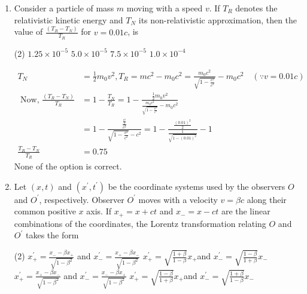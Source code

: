 \begin{enumerate}
	\item Consider a particle of mass $m$ moving with a speed $v$. If $T_{R}$ denotes the relativistic kinetic energy and $T_{N}$ its non-relativistic approximation, then the value of $\frac{\left(T_{R}-T_{N}\right)}{T_{R}}$ for $v=0.01 c$, is
	{}
\begin{tasks}(2)
	\task[\textbf{A.}] $1.25 \times 10^{-5}$
	\task[\textbf{B.}]$5.0 \times 10^{-5}$
	\task[\textbf{C.}]$7.5 \times 10^{-5}$
	\task[\textbf{D.}]$1.0 \times 10^{-4}$
\end{tasks}
\begin{answer}
	\begin{align*}
	T_{N}&=\frac{1}{2} m_{0} v^{2}, T_{R}=m c^{2}-m_{0} c^{2}=\frac{m_{0} c^{2}}{\sqrt{1-\frac{v^{2}}{c^{2}}}}-m_{0} c^{2} \quad(\because v=0.01 c)\\
	\text { Now, } \frac{\left(T_{R}-T_{N}\right)}{T_{R}}&=1-\frac{T_{N}}{T_{R}}=1-\frac{\frac{1}{2} m_{0} v^{2}}{\frac{m_{0} c^{2}}{\sqrt{1-\frac{v^{2}}{c^{2}}}}-m_{0} c^{2}}\\
	&=1-\frac{\frac{\frac{v^{2}}{2}}{c^{2}}}{\sqrt{1-\frac{v^{2}}{c^{2}}}-c^{2}}=1-\frac{\frac{(0.01)^{2}}{2}}{\frac{1}{\sqrt{1-(0.01)^{2}}}}-1\\
	\frac{T_{R}-T_{N}}{T_{R}}&=0.75
	\end{align*}
	None of the option is correct.
\end{answer}
	\item Let $(x, t)$ and $\left(x^{\prime}, t^{\prime}\right)$ be the coordinate systems used by the observers $O$ and $O^{\prime}$, respectively. Observer $O^{\prime}$ moves with a velocity $v=\beta c$ along their common positive $x$ axis. If $x_{+}=x+c t$ and $x_{-}=x-c t$ are the linear combinations of the coordinates, the Lorentz transformation relating $O$ and $O^{\prime}$ takes the form
	{}
\begin{tasks}(2)
	\task[\textbf{A.}] $x_{+}^{\prime}=\frac{x_{-}-\beta x_{+}}{\sqrt{1-\beta^{2}}}$ and $x_{-}^{\prime}=\frac{x_{+}-\beta x_{-}}{\sqrt{1-\beta^{2}}}$
	\task[\textbf{B.}]$x_{+}^{\prime}=\sqrt{\frac{1+\beta}{1-\beta}} x_{+}$and $x_{-}^{\prime}=\sqrt{\frac{1-\beta}{1+\beta}} x_{-}$
	\task[\textbf{C.}]$x_{+}^{\prime}=\frac{x_{+}-\beta x_{-}}{\sqrt{1-\beta^{2}}}$ and $x_{-}^{\prime}=\frac{x_{-}-\beta x_{+}}{\sqrt{1-\beta^{2}}}$
	\task[\textbf{D.}]$x_{+}^{\prime}=\sqrt{\frac{1-\beta}{1+\beta}} x_{+}$and $x_{-}^{\prime}=\sqrt{\frac{1+\beta}{1-\beta}} x_{-}$
\end{tasks}
\begin{answer}

\end{answer}
\end{enumerate}
